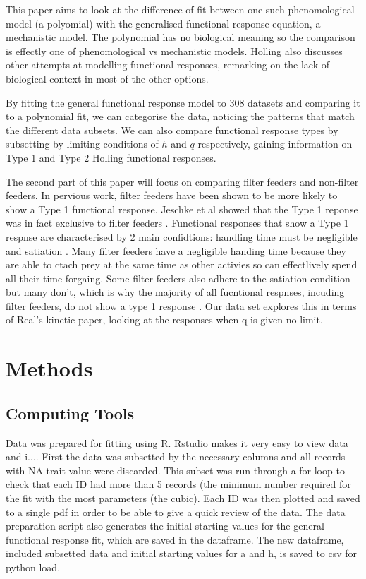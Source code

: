 \documentclass[11pt, a4paper, titlepage]{article}
\begin{document}
This paper aims to look at the difference of fit between one such phenomological model (a polyomial) with the generalised functional response equation, a mechanistic model. The polynomial has no biological meaning so the comparison is effectly one of phenomological vs mechanistic models. 
Holling also discusses other attempts at modelling functional responses, remarking on the lack of biological context in most of the other options. \parencite{Holling1965}

By fitting the general functional response model to 308 datasets and comparing it to a polynomial fit, we can categorise the data, noticing the patterns that match the different data subsets. We can also compare functional response types by subsetting by limiting conditions of $h$ and $q$ respectively, gaining information on Type 1 and Type 2 Holling functional responses.

The second part of this paper will focus on comparing filter feeders and non-filter feeders. In pervious work, filter feeders have been shown to be more likely to show a Type 1 functional response. Jeschke et al showed that the Type 1 reponse was in fact exclusive to filter feeders \parencite{Jeschke2004}.  Functional responses that show a Type 1 respnse are characterised by 2 main confidtions: handling time must be negligible and satiation \parencite{Jeschke2002}. Many filter feeders have a negligible handing time because they are able to ctach prey at the same time as other activies so can effectlively spend all their time forgaing. Some filter feeders also adhere to the satiation condition but many don't, which is why the majority of all fucntional respnses, incuding filter feeders, do not show a type 1 response \parencite{Jeschke2004, Deville2013, Porter1983}. Our data set explores this in terms of Real's kinetic paper, looking at the responses when q is given no limit. \parencite{Real1977}

\section{Methods}

\subsection{Computing Tools}

Data was prepared for fitting using R. Rstudio makes it very easy to view data and i.... First the data was subsetted by the necessary columns and all records with NA trait value were discarded. This subset was run through a for loop to check that each ID had more than 5 records (the minimum number required for the fit with the most parameters (the cubic). Each ID was then plotted and saved to a single pdf in order to be able to give a quick review of the data. The data preparation script also generates the initial starting values for the general functional response fit, which are saved in the dataframe. The new dataframe, included subsetted data and initial starting values for a and h, is saved to csv for python load.
\end{document}
